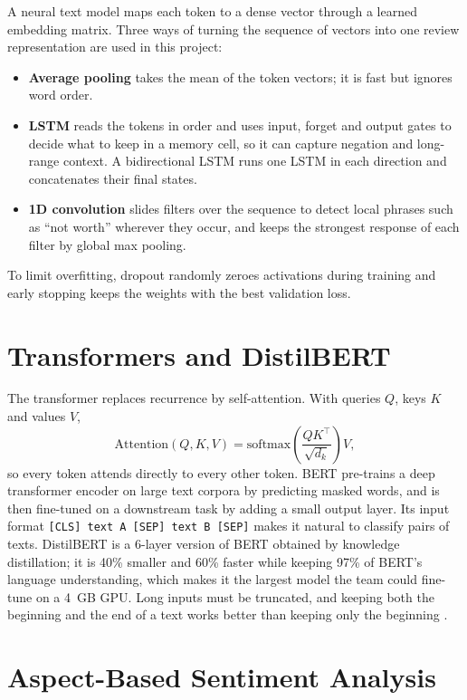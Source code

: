 A neural text model maps each token to a dense vector through a learned embedding matrix. Three ways of turning the sequence of vectors into one review representation are used in this project:
\begin{itemize}
    \item \textbf{Average pooling} takes the mean of the token vectors; it is fast but ignores word order.
    \item \textbf{LSTM} \cite{Hochreiter1997} reads the tokens in order and uses input, forget and output gates to decide what to keep in a memory cell, so it can capture negation and long-range context. A bidirectional LSTM runs one LSTM in each direction and concatenates their final states.
    \item \textbf{1D convolution} \cite{Kim2014} slides filters over the sequence to detect local phrases such as ``not worth'' wherever they occur, and keeps the strongest response of each filter by global max pooling.
\end{itemize}
To limit overfitting, dropout randomly zeroes activations during training and early stopping keeps the weights with the best validation loss.

\section{Transformers and DistilBERT}

The transformer \cite{Vaswani2017} replaces recurrence by self-attention. With queries $Q$, keys $K$ and values $V$,
\begin{equation}
    \text{Attention}(Q, K, V) = \text{softmax}\left(\frac{QK^\top}{\sqrt{d_k}}\right) V,
\end{equation}
so every token attends directly to every other token. BERT \cite{Devlin2019} pre-trains a deep transformer encoder on large text corpora by predicting masked words, and is then fine-tuned on a downstream task by adding a small output layer. Its input format \texttt{[CLS] text A [SEP] text B [SEP]} makes it natural to classify pairs of texts. DistilBERT \cite{Sanh2019} is a 6-layer version of BERT obtained by knowledge distillation; it is 40\% smaller and 60\% faster while keeping 97\% of BERT's language understanding, which makes it the largest model the team could fine-tune on a 4~GB GPU. Long inputs must be truncated, and keeping both the beginning and the end of a text works better than keeping only the beginning \cite{SunFinetune2019}.

\section{Aspect-Based Sentiment Analysis}

